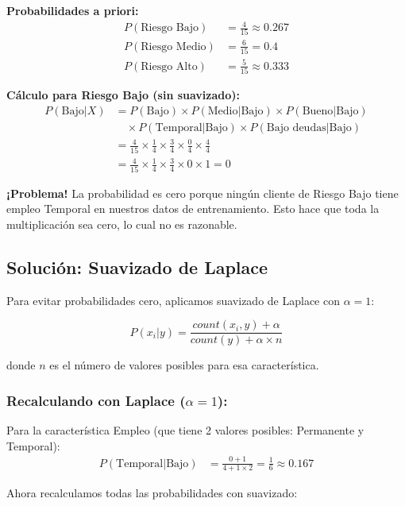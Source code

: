 \documentclass[12pt]{article}
\begin{document}
\textbf{Probabilidades a priori:}
\begin{align*}
P(\text{Riesgo Bajo}) &= \frac{4}{15} \approx 0.267 \\
P(\text{Riesgo Medio}) &= \frac{6}{15} = 0.4 \\
P(\text{Riesgo Alto}) &= \frac{5}{15} \approx 0.333
\end{align*}

\textbf{Cálculo para Riesgo Bajo (sin suavizado):}
\begin{align*}
P(\text{Bajo}|X) &= P(\text{Bajo}) \times P(\text{Medio}|\text{Bajo}) \times P(\text{Bueno}|\text{Bajo}) \\
&\quad \times P(\text{Temporal}|\text{Bajo}) \times P(\text{Bajo deudas}|\text{Bajo}) \\
&= \frac{4}{15} \times \frac{1}{4} \times \frac{3}{4} \times \frac{0}{4} \times \frac{4}{4} \\
&= \frac{4}{15} \times \frac{1}{4} \times \frac{3}{4} \times 0 \times 1 = 0
\end{align*}

\textbf{¡Problema!} La probabilidad es cero porque ningún cliente de Riesgo Bajo tiene empleo Temporal en nuestros datos de entrenamiento. Esto hace que toda la multiplicación sea cero, lo cual no es razonable.

\subsection{Solución: Suavizado de Laplace}
Para evitar probabilidades cero, aplicamos suavizado de Laplace con $\alpha = 1$:

\[
P(x_i|y) = \frac{count(x_i, y) + \alpha}{count(y) + \alpha \times n}
\]

donde $n$ es el número de valores posibles para esa característica.

\subsubsection{Recalculando con Laplace ($\alpha = 1$):}

Para la característica Empleo (que tiene 2 valores posibles: Permanente y Temporal):
\begin{align*}
P(\text{Temporal}|\text{Bajo}) &= \frac{0 + 1}{4 + 1 \times 2} = \frac{1}{6} \approx 0.167
\end{align*}

Ahora recalculamos todas las probabilidades con suavizado:

\vspace{0.5cm}
\end{document}
